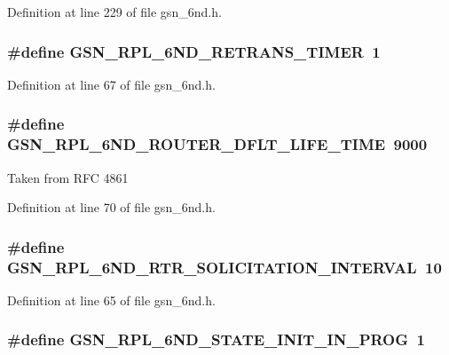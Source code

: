 Definition at line 229 of file gsn\_\-6nd.h.

\hypertarget{a00473_a35cfb15e0c380537b0fb8fce788a4034}{
\subsubsection[{GSN\_\-RPL\_\-6ND\_\-RETRANS\_\-TIMER}]{\setlength{\rightskip}{0pt plus 5cm}\#define GSN\_\-RPL\_\-6ND\_\-RETRANS\_\-TIMER~1}}
\label{a00473_a35cfb15e0c380537b0fb8fce788a4034}


Definition at line 67 of file gsn\_\-6nd.h.

\hypertarget{a00473_a724fcb51530345d55dcc892795b9727f}{
\subsubsection[{GSN\_\-RPL\_\-6ND\_\-ROUTER\_\-DFLT\_\-LIFE\_\-TIME}]{\setlength{\rightskip}{0pt plus 5cm}\#define GSN\_\-RPL\_\-6ND\_\-ROUTER\_\-DFLT\_\-LIFE\_\-TIME~9000}}
\label{a00473_a724fcb51530345d55dcc892795b9727f}
Taken from RFC 4861 

Definition at line 70 of file gsn\_\-6nd.h.

\hypertarget{a00473_a7342fab62085d659e89dfd26a75c64a1}{
\subsubsection[{GSN\_\-RPL\_\-6ND\_\-RTR\_\-SOLICITATION\_\-INTERVAL}]{\setlength{\rightskip}{0pt plus 5cm}\#define GSN\_\-RPL\_\-6ND\_\-RTR\_\-SOLICITATION\_\-INTERVAL~10}}
\label{a00473_a7342fab62085d659e89dfd26a75c64a1}


Definition at line 65 of file gsn\_\-6nd.h.

\hypertarget{a00473_a3af8b30b7cd03854b8474534842ddc6a}{
\subsubsection[{GSN\_\-RPL\_\-6ND\_\-STATE\_\-INIT\_\-IN\_\-PROG}]{\setlength{\rightskip}{0pt plus 5cm}\#define GSN\_\-RPL\_\-6ND\_\-STATE\_\-INIT\_\-IN\_\-PROG~1}}
\label{a00473_a3af8b30b7cd03854b8474534842ddc6a}


